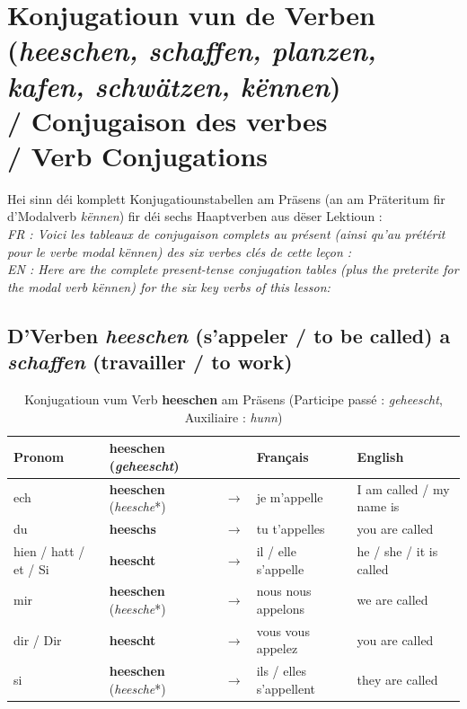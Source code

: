 \vspace{1.5em}

\section[Konjugatioun vun de Verben / Verb Conjugations]{Konjugatioun vun de Verben (\textit{heeschen, schaffen, planzen, kafen, schwätzen, kënnen}) \\/ Conjugaison des verbes \\/ Verb Conjugations}

Hei sinn déi komplett Konjugatiounstabellen am Präsens (an am Präteritum fir d'Modalverb \textit{kënnen}) fir déi sechs Haaptverben aus dëser Lektioun : \\
\textit{FR : Voici les tableaux de conjugaison complets au présent (ainsi qu'au prétérit pour le verbe modal \textit{kënnen}) des six verbes clés de cette leçon :} \\
\textit{EN : Here are the complete present-tense conjugation tables (plus the preterite for the modal verb \textit{kënnen}) for the six key verbs of this lesson:}

\subsection{D'Verben \textit{heeschen} (s'appeler / to be called) a \textit{schaffen} (travailler / to work)}

\begin{table}[htbp]
    \centering
    \begin{tabular}{ll c l l}
        \toprule
        \textbf{Pronom} & \textbf{heeschen} (\textit{geheescht}) & & \textbf{Français} & \textbf{English} \\
        \midrule
        ech & \textbf{heeschen} (\textit{heesche}*) & $\rightarrow$ & je m'appelle & I am called / my name is \\
        du & \textbf{heeschs} & $\rightarrow$ & tu t'appelles & you are called \\
        hien / hatt / et / Si & \textbf{heescht} & $\rightarrow$ & il / elle s'appelle & he / she / it is called \\
        \midrule
        mir & \textbf{heeschen} (\textit{heesche}*) & $\rightarrow$ & nous nous appelons & we are called \\
        dir / Dir & \textbf{heescht} & $\rightarrow$ & vous vous appelez & you are called \\
        si & \textbf{heeschen} (\textit{heesche}*) & $\rightarrow$ & ils / elles s'appellent & they are called \\
        \bottomrule
    \end{tabular}
    \caption{Konjugatioun vum Verb \textbf{heeschen} am Präsens (Participe passé : \textit{geheescht}, Auxiliaire : \textit{hunn})}
\end{table}

